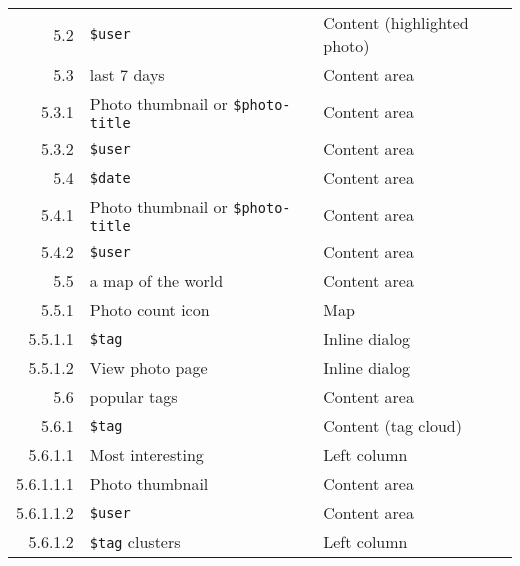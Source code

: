 \documentclass[11pt,a4paper]{article}
\newcommand{\var}[1]{\texttt{\${#1}}}
\begin{document}
\begin{center}
\begin{small}
\begin{longtable}{rll}
        5.2 &
        \var{user} &
        Content (highlighted photo) \\

        5.3 &
        last 7 days &
        Content area \\

          5.3.1 &
          Photo thumbnail or \var{photo-title} &
          Content area \\

          5.3.2 &
          \var{user} &
          Content area \\

        5.4 &
        \var{date} &
        Content area \\

          5.4.1 &
          Photo thumbnail or \var{photo-title} &
          Content area \\

          5.4.2 &
          \var{user} &
          Content area \\

        5.5 &
        a map of the world &
        Content area \\

          5.5.1 &
          Photo count icon &
          Map \\

            5.5.1.1 &
            \var{tag} &
            Inline dialog \\

            5.5.1.2 &
            View photo page &
            Inline dialog \\

        5.6 &
        popular tags &
        Content area \\

          5.6.1 &
          \var{tag} &
          Content (tag cloud) \\

            5.6.1.1 &
            Most interesting &
            Left column \\

              5.6.1.1.1 &
              Photo thumbnail &
              Content area \\

              5.6.1.1.2 &
              \var{user} &
              Content area \\

            5.6.1.2 &
            \var{tag} clusters &
            Left column \\


\end{longtable}
\end{small}
\end{center}
\end{document}

